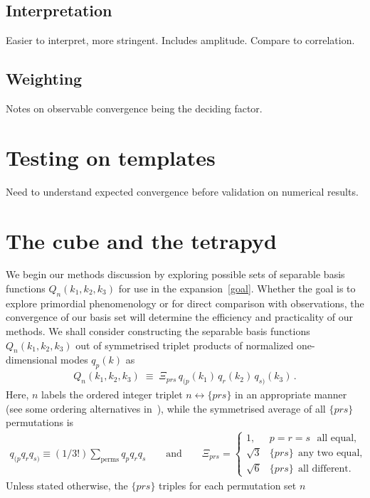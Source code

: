     \subsection{Interpretation}
    Easier to interpret, more stringent.
    Includes amplitude.
    Compare to correlation.
    \subsection{Weighting}
    Notes on observable convergence being the deciding factor.
\section{Testing on templates}
    Need to understand expected convergence before validation on numerical results.
\section{The cube and the tetrapyd}
We begin our methods discussion by exploring possible sets of separable
basis functions $Q_n(k_1,k_2,k_3)$
for use in the expansion~\eqref{goal}.
Whether the goal is to explore primordial phenomenology or for direct comparison with observations,
the convergence of our basis set will determine the efficiency and practicality
of our methods.
We shall consider constructing the separable basis functions $Q_n(k_1,k_2,k_3)$
out of symmetrised triplet products of normalized one-dimensional modes $q_p(k)$ as
\begin{align}\label{modes3d}
    Q_n(k_1,k_2,k_3) \;\equiv\; {\Xi_{prs} } \, q_{(p} (k_1) \, q_{r}(k_2)\, q_{s)}(k_3)\,.
\end{align}
Here,  $n$ labels the ordered integer triplet $n \leftrightarrow \{p r s\}$ in an appropriate manner (see some ordering alternatives in~\cite{FergShell_3}), while the symmetrised average of all $\{p r s\}$ permutations is 
\begin{align}\label{modes3dsum}
    q_{(p}q_{r}q_{s)}\equiv(1/3!)\sum_\text{perms}q_{p}q_{r}q_{s}\qquad \text{and} \qquad 
     \Xi_{prs}= 
     \begin{cases}
     1, & p = r = s ~~~\text{all equal},\\
     \sqrt{3} & \{p r s\} ~~\text{any two equal,} \\
     \sqrt{6} & \{p r s\}  ~~\text{all  different.}
     \end{cases}
\end{align}
Unless stated otherwise, the $\{prs\}$ triples for each permutation set $n$
